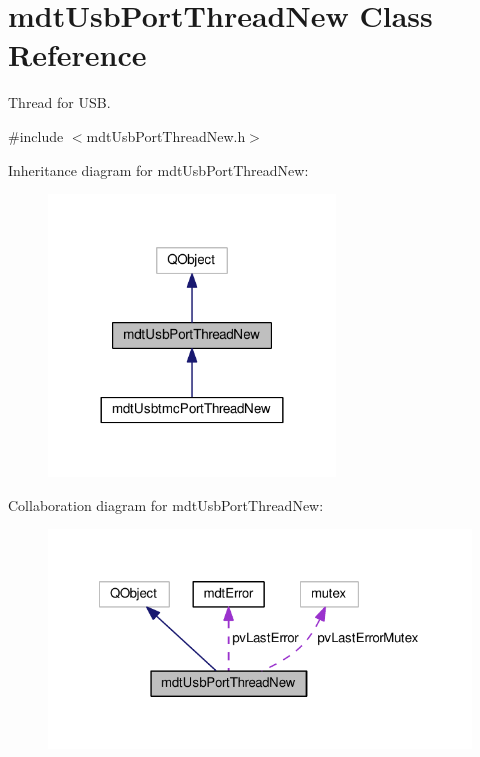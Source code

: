 \hypertarget{classmdt_usb_port_thread_new}{\section{mdt\-Usb\-Port\-Thread\-New Class Reference}
\label{classmdt_usb_port_thread_new}
}


Thread for U\-S\-B.  




{\ttfamily \#include $<$mdt\-Usb\-Port\-Thread\-New.\-h$>$}



Inheritance diagram for mdt\-Usb\-Port\-Thread\-New\-:\nopagebreak
\begin{figure}[H]
\begin{center}
\leavevmode
\includegraphics[width=216pt]{classmdt_usb_port_thread_new__inherit__graph}
\end{center}
\end{figure}


Collaboration diagram for mdt\-Usb\-Port\-Thread\-New\-:\nopagebreak
\begin{figure}[H]
\begin{center}
\leavevmode
\includegraphics[width=324pt]{classmdt_usb_port_thread_new__coll__graph}
\end{center}
\end{figure}
